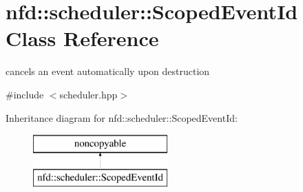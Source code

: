 \hypertarget{classnfd_1_1scheduler_1_1ScopedEventId}{}\section{nfd\+:\+:scheduler\+:\+:Scoped\+Event\+Id Class Reference}
\label{classnfd_1_1scheduler_1_1ScopedEventId}


cancels an event automatically upon destruction  




{\ttfamily \#include $<$scheduler.\+hpp$>$}

Inheritance diagram for nfd\+:\+:scheduler\+:\+:Scoped\+Event\+Id\+:\begin{figure}[H]
\begin{center}
\leavevmode
\includegraphics[height=2.000000cm]{classnfd_1_1scheduler_1_1ScopedEventId}
\end{center}
\end{figure}
